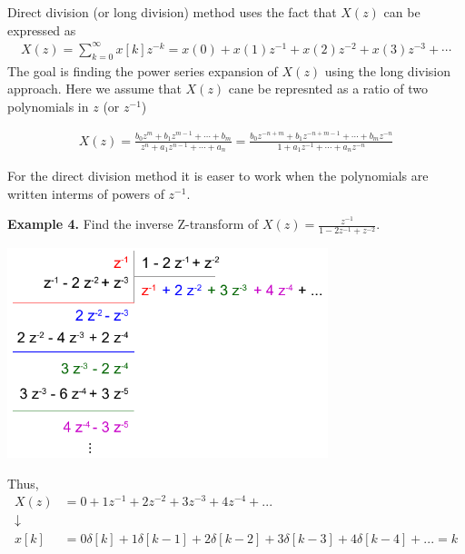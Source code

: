 \documentclass[twoside]{article}
\begin{document}
Direct division (or long division) method uses the fact that $X(z)$
can be expressed as
%
\begin{align*}
  X(z) = \sum\limits_{k=0}^{\infty} x[k] z^{-k} = x(0) + x(1) z^{-1} +
  x(2) z^{-2} + x(3) z^{-3} + \cdots
\end{align*}
%
The goal is finding the power series expansion of $X(z)$ using the
long division approach. Here we assume that $X(z)$ cane be represnted
as a ratio of two polynomials in $z$ (or $z^{-1}$) 

\begin{align*}
  X(z) = \frac{b_0 z^m + b_1 z^{m-1} + \cdots + b_m}{z^n + a_1
  z^{n-1} + \cdots + a_n} = 
\frac{b_0 z^{-n+m} + b_1 z^{-n+m-1} + \cdots + b_m z^{-n}}{1 + a_1
  z^{-1} + \cdots + a_n z^{-n}} 
\end{align*}

For the direct division method it is easer to work when the
polynomials are written interms of powers of $z^{-1}$.

\textbf{Example 4.} Find the inverse Z-transform of $X(z) =
\frac{z^{-1}}{1 - 2 z^{-1} + z^{-2}}$.  

\begin{center}
  \begin{minipage}[h]{0.9\linewidth}
    \begin{center}
      \includegraphics[width=0.7\textwidth]{directdivision}
    \end{center}
  \end{minipage}
\end{center}
%
Thus, 
%
\begin{align*} 
  X(z) &= 0 + 1 z^{-1} + 2 z^{-2} + 3 z^{-3} + 4 z^{-4} + ...  \\
 \downarrow
\\
  x[k] &= 0 \delta[k] + 1 \delta[k-1] + 2 \delta[k-2] + 3 \delta[k-3] + 4
  \delta[k-4] + ...  = k
\end{align*}
%
\end{document}
